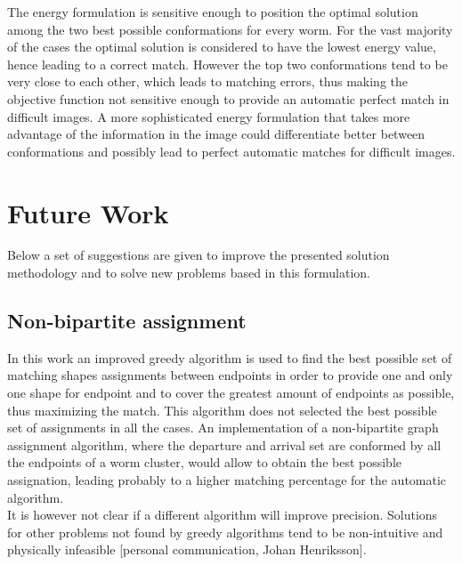The energy formulation is sensitive enough to position the optimal solution
among the two best possible conformations for every worm. For the vast majority
of the cases the optimal solution is considered to have the lowest 
energy value, hence
leading to a correct match. However the top two conformations tend to be
very close to each other, which leads to matching errors, thus making
the objective function not sensitive enough to provide an automatic perfect
match in difficult images. A more sophisticated energy formulation that
takes more advantage of the information in the image could
differentiate better between conformations and possibly
lead to perfect automatic matches for difficult images.


\section{Future Work}

Below a set of suggestions are given to improve the presented solution
methodology and to solve new problems based in this formulation.

\subsection*{Non-bipartite assignment}
In this work an improved greedy algorithm is used to find the best
possible set of matching shapes assignments between endpoints in order
to provide one and only one shape for endpoint and to cover the greatest
amount of endpoints as possible, thus maximizing the match. This algorithm
does not selected the best possible set of assignments in all the cases. 
An implementation of a non-bipartite graph assignment algorithm, where
the departure and arrival set are conformed by all the endpoints of a worm
cluster, would allow to obtain the best possible assignation, leading
probably to a higher matching percentage for the automatic algorithm.\\

It is however not clear if a different algorithm will improve precision.
Solutions for other problems not found by greedy algorithms tend to be
non-intuitive and physically infeasible [personal communication, Johan Henriksson].


